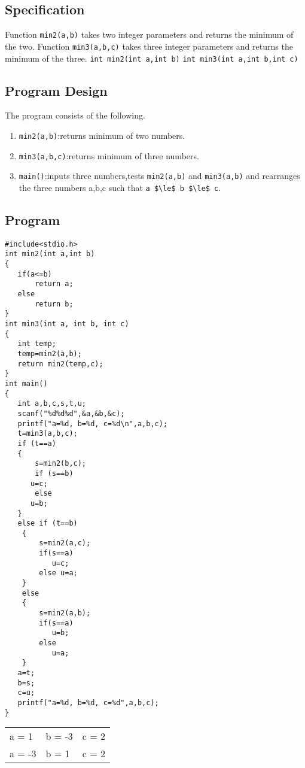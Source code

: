 \documentclass[11pt]{article}
\begin{document}
\subsection*{Specification}
\label{sec-10-2}
Function \texttt{min2(a,b)} takes two integer parameters and returns the minimum of the two.
Function \texttt{min3(a,b,c)} takes three integer parameters and returns the minimum of the three.
\texttt{int min2(int a,int b)}
\texttt{int min3(int a,int b,int c)}

\subsection*{Program Design}
\label{sec-10-3}
The program consists of the following.
\begin{enumerate}
\item \texttt{min2(a,b)}:returns minimum of two numbers.
\item \texttt{min3(a,b,c)}:returns minimum of three numbers.
\item \texttt{main()}:inputs three numbers,tests \texttt{min2(a,b)} and \texttt{min3(a,b)} and rearranges the three numbers a,b,c such that \texttt{a \$\textbackslash{}le\$ b \$\textbackslash{}le\$ c}.
\end{enumerate}

\subsection*{Program}
\label{sec-10-4}
\begin{verbatim}
#include<stdio.h>
int min2(int a,int b)
{
   if(a<=b)
       return a;
   else
       return b;
}
int min3(int a, int b, int c)
{
   int temp;
   temp=min2(a,b);
   return min2(temp,c);
}
int main()
{
   int a,b,c,s,t,u;
   scanf("%d%d%d",&a,&b,&c);
   printf("a=%d, b=%d, c=%d\n",a,b,c);
   t=min3(a,b,c);
   if (t==a)
   {
       s=min2(b,c);
       if (s==b)
	  u=c;
       else
	  u=b;
   }
   else if (t==b)
	{
	    s=min2(a,c);
	    if(s==a)
	       u=c;
	    else u=a;
	} 
	else
	{
	    s=min2(a,b);
	    if(s==a)
	       u=b;
	    else
	       u=a;
	}
   a=t;
   b=s;
   c=u;
   printf("a=%d, b=%d, c=%d",a,b,c);
}
\end{verbatim}

\begin{center}
\begin{tabular}{lll}
a = 1 & b = -3 & c = 2\\
a = -3 & b = 1 & c = 2\\
\end{tabular}
\end{center}
\end{document}
